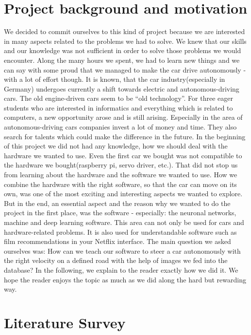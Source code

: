 \documentclass[journal]{IEEEtran}
\begin{document}
\section{Project background and motivation}
\label{sec:backgroundMotivation}
We decided to commit ourselves to this kind of project because we are interested in many aspects related to the problems we had to solve. We knew that our skills and our knowledge was not sufficient in order to solve those problems we would encounter. Along the many hours we spent, we had to learn new things and we can say with some proud that we managed to make the car drive autonomously - with a lot of effort though.
It is known, that the car industry(especially in Germany) undergoes currently a shift towards electric and autonomous-driving cars. The old engine-driven cars seem to be “old technology”. For three eager students who are interested in informatics and everything which is related to computers, a new opportunity arose and is still arising. Especially in the area of autonomous-driving cars companies invest a lot of money and time. They also search for talents which could make the difference in the future. In the beginning of this project we did  not had any knowledge, how we should deal with the hardware we wanted to use. Even the first car we bought was not compatible to the hardware we bought(raspberry pi, servo driver, etc.). That did not stop us from learning about the hardware and the software we wanted to use. How we combine the hardware with the right software, so that the car can move on its own, was one of the most exciting and interesting aspects we wanted to explore.
But in the end, an essential aspect and the reason why we wanted to do the project in the first place, was the software - especially: the neuronal networks, machine and deep learning software. This area can not only be used for cars and hardware-related problems. It is also used for understandable software such as film recommendations in your Netflix interface.
The main question we asked ourselves was: How can we teach our software to steer a car autonomously with the right velocity on a defined road with the help of images we fed into the database? In the following, we explain to the reader exactly how we did it. We hope the reader enjoys the topic as much as we did along the hard but rewarding way.

\section{Literature Survey}
\label{sec:LiteratureSurvey}
\end{document}
